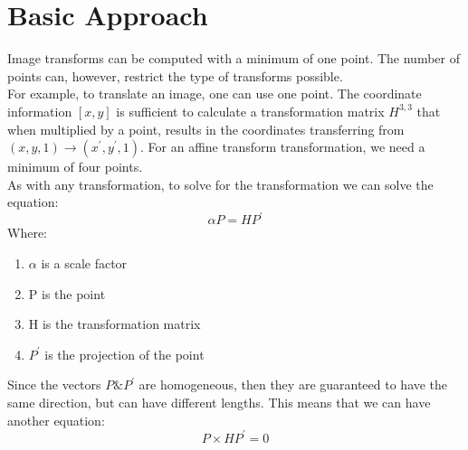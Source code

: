 \documentclass[10pt,twocolumn,letterpaper]{article}
\begin{document}
\section{Basic Approach}
Image transforms can be computed with a minimum of one point. The number of points can, however, restrict the type of transforms possible.\\
For example, to translate an image, one can use one point. The coordinate information $[x,y]$ is sufficient to calculate a transformation matrix $H^{3,3}$ that when multiplied by a point, results in the coordinates transferring from $(x,y,1) \to (x^{'}, y^{'},1)$.
For an affine transform transformation, we need a minimum of four points.\\
As with any transformation, to solve for the transformation we can solve the equation:\\
\begin{equation}
\alpha P = HP^{'}
\end{equation}
Where:
\begin{enumerate}
\item{$\alpha$} is a scale factor
\item{P} is the point
\item{H} is the transformation matrix
\item{$P^{'}$} is the projection of the point
\end{enumerate}
Since the vectors $P \& P^{'}$ are homogeneous, then they are guaranteed to have the same direction, but can have different lengths. This means that we can have another equation:
\begin{equation}
P \times HP^{'} = 0
\label{eq:trans_cross}
\end{equation}
\end{document}
